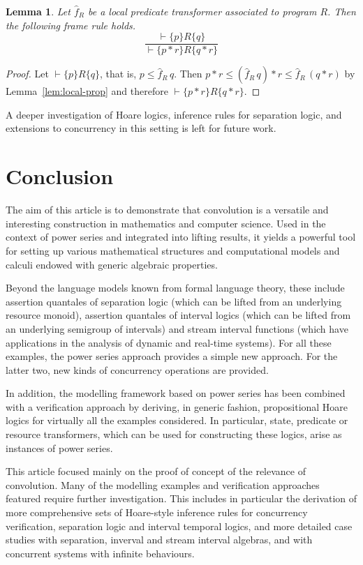 \documentclass[12pt]{article}
\newtheorem{lemma}{Lemma}
\theoremstyle{definition}
\begin{document}
\begin{lemma}
  Let $\hat{f}_R$ be a local predicate transformer associated to program
  $R$. Then the following frame rule holds.
  \begin{equation*}
    \frac{\vdash\{p\}R\{q\}}{\vdash\{p\ast r\}R\{q\ast r\}}
  \end{equation*}
\end{lemma}
\begin{proof} 
  Let $\vdash\{p\}R\{q\}$, that is, $p\le \hat{f}_R\, q$. Then $p \ast
  r \le (\hat{f}_R\, q) \ast r \le \hat{f}_R\, (q \ast r)$ by
  Lemma~\ref{lem:local-prop} and therefore $\vdash\{p\ast r\}R\{q\ast
  r\}$.
\end{proof}
A deeper investigation of Hoare logics, inference rules for separation
logic, and extensions to concurrency in this setting is left for
future work.



\section{Conclusion}\label{sec:conclusion}

The aim of this article is to demonstrate that convolution is a
versatile and interesting construction in mathematics and computer
science.  Used in the context of power series and integrated into
lifting results, it yields a powerful tool for setting up various
mathematical structures and computational models and calculi endowed
with generic algebraic properties.

Beyond the language models known from formal language theory, these
include assertion quantales of separation logic (which can be lifted
from an underlying resource monoid), assertion quantales of interval
logics (which can be lifted from an underlying semigroup of intervals)
and stream interval functions (which have applications in the analysis
of dynamic and real-time systems). For all these examples, the power
series approach provides a simple new approach. For the latter two,
new kinds of concurrency operations are provided.

In addition, the modelling framework based on power series has been
combined with a verification approach by deriving, in generic fashion,
propositional Hoare logics for virtually all the examples
considered. In particular, state, predicate or resource transformers,
which can be used for constructing these logics, arise as instances of
power series.

This article focused mainly on the proof of concept of the relevance
of convolution. Many of the modelling examples and verification
approaches featured require further investigation. This includes in
particular the derivation of more comprehensive sets of Hoare-style
inference rules for concurrency verification, separation logic and
interval temporal logics, and more detailed case studies with
separation, inverval and stream interval algebras, and with concurrent
systems with infinite behaviours.
\end{document}
